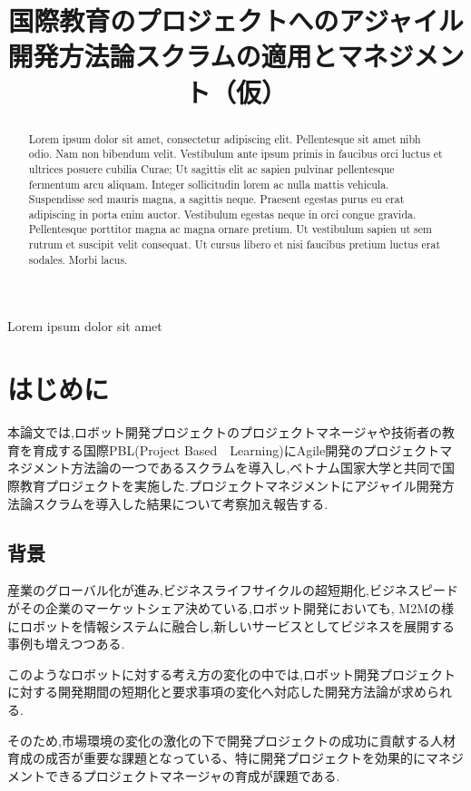 \documentclass[paper]{jrsj}
\title{
国際教育のプロジェクトへのアジャイル開発方法論スクラムの適用とマネジメント（仮）
}
\subtitle{}
\begin{document}
\begin{abstract}
Lorem ipsum dolor sit amet, consectetur adipiscing elit. Pellentesque sit amet nibh odio. Nam non bibendum velit. Vestibulum ante ipsum primis in faucibus orci luctus et ultrices posuere cubilia Curae; Ut sagittis elit ac sapien pulvinar pellentesque fermentum arcu aliquam. Integer sollicitudin lorem ac nulla mattis vehicula. Suspendisse sed mauris magna, a sagittis neque. Praesent egestas purus eu erat adipiscing in porta enim auctor. Vestibulum egestas neque in orci congue gravida. Pellentesque porttitor magna ac magna ornare pretium. Ut vestibulum sapien ut sem rutrum et suscipit velit consequat. Ut cursus libero et nisi faucibus pretium luctus erat sodales. Morbi lacus.
\end{abstract}
\begin{keywords}
Lorem ipsum dolor sit amet
\end{keywords}
\maketitle
\small
\section{はじめに}

本論文では,ロボット開発プロジェクトのプロジェクトマネージャや技術者の教育を育成する国際PBL(Project
Based　Learning)にAgile開発のプロジェクトマネジメント方法論の一つであるスクラムを導入し,ベトナム国家大学と共同で国際教育プロジェクトを実施した.プロジェクトマネジメントにアジャイル開発方法論スクラムを導入した結果について考察加え報告する.

\subsection{背景}

産業のグローバル化が進み,ビジネスライフサイクルの超短期化,ビジネスピードがその企業のマーケットシェア決めている,ロボット開発においても, M2Mの様にロボットを情報システムに融合し,新しいサービスとしてビジネスを展開する事例も増えつつある.

このようなロボットに対する考え方の変化の中では,ロボット開発プロジェクトに対する開発期間の短期化と要求事項の変化へ対応した開発方法論が求められる.

そのため,市場環境の変化の激化の下で開発プロジェクトの成功に貢献する人材育成の成否が重要な課題となっている、特に開発プロジェクトを効果的にマネジメントできるプロジェクトマネージャの育成が課題である.
\end{document}
